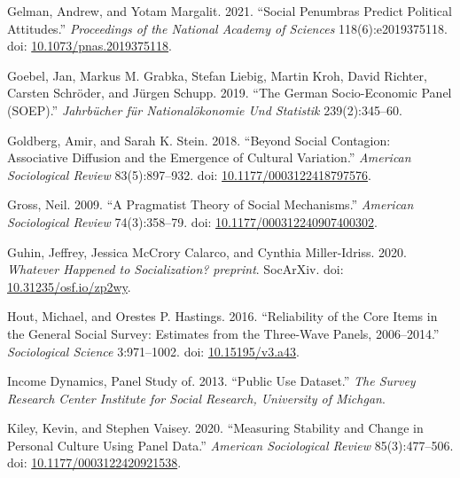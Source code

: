\documentclass[
  12pt,
]{article}
\newlength{\cslhangindent}
\newlength{\cslentryspacingunit} %
\newenvironment{CSLReferences}[2] %
 {%
  \setlength{\parindent}{0pt}
  \ifodd #1
  \let\oldpar\par
  \def\par{\hangindent=\cslhangindent\oldpar}
  \fi
  \setlength{\parskip}{#2\cslentryspacingunit}
 }%
 {}
\begin{document}
\begin{CSLReferences}{1}{0}
\leavevmode{}%
Gelman, Andrew, and Yotam Margalit. 2021. {``Social Penumbras Predict
Political Attitudes.''} \emph{Proceedings of the National Academy of
Sciences} 118(6):e2019375118. doi:
\href{https://doi.org/10.1073/pnas.2019375118}{10.1073/pnas.2019375118}.

\leavevmode{}%
Goebel, Jan, Markus M. Grabka, Stefan Liebig, Martin Kroh, David
Richter, Carsten Schröder, and Jürgen Schupp. 2019. {``The German
Socio-Economic Panel (SOEP).''} \emph{Jahrb{ü}cher f{ü}r
National{ö}konomie Und Statistik} 239(2):345--60.

\leavevmode{}%
Goldberg, Amir, and Sarah K. Stein. 2018. {``Beyond {Social}
{Contagion}: {Associative} {Diffusion} and the {Emergence} of {Cultural}
{Variation}.''} \emph{American Sociological Review} 83(5):897--932. doi:
\href{https://doi.org/10.1177/0003122418797576}{10.1177/0003122418797576}.

\leavevmode{}%
Gross, Neil. 2009. {``A {Pragmatist} {Theory} of {Social}
{Mechanisms}.''} \emph{American Sociological Review} 74(3):358--79. doi:
\href{https://doi.org/10.1177/000312240907400302}{10.1177/000312240907400302}.

\leavevmode{}%
Guhin, Jeffrey, Jessica McCrory Calarco, and Cynthia Miller-Idriss.
2020. \emph{Whatever {Happened} to {Socialization}?} \emph{preprint}.
SocArXiv. doi:
\href{https://doi.org/10.31235/osf.io/zp2wy}{10.31235/osf.io/zp2wy}.

\leavevmode{}%
Hout, Michael, and Orestes P. Hastings. 2016. {``Reliability of the
{Core} {Items} in the {General} {Social} {Survey}: {Estimates} from the
{Three}-{Wave} {Panels}, 2006--2014.''} \emph{Sociological Science}
3:971--1002. doi:
\href{https://doi.org/10.15195/v3.a43}{10.15195/v3.a43}.

\leavevmode{}%
Income Dynamics, Panel Study of. 2013. {``Public Use Dataset.''}
\emph{The Survey Research Center Institute for Social Research,
University of Michgan}.

\leavevmode{}%
Kiley, Kevin, and Stephen Vaisey. 2020. {``Measuring {Stability} and
{Change} in {Personal} {Culture} {Using} {Panel} {Data}.''}
\emph{American Sociological Review} 85(3):477--506. doi:
\href{https://doi.org/10.1177/0003122420921538}{10.1177/0003122420921538}.


\end{CSLReferences}
\end{document}
